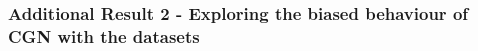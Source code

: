 
\subsubsection{Additional Result 2 - Exploring the biased behaviour of CGN\cite{sauer2021counterfactual} with the datasets}


